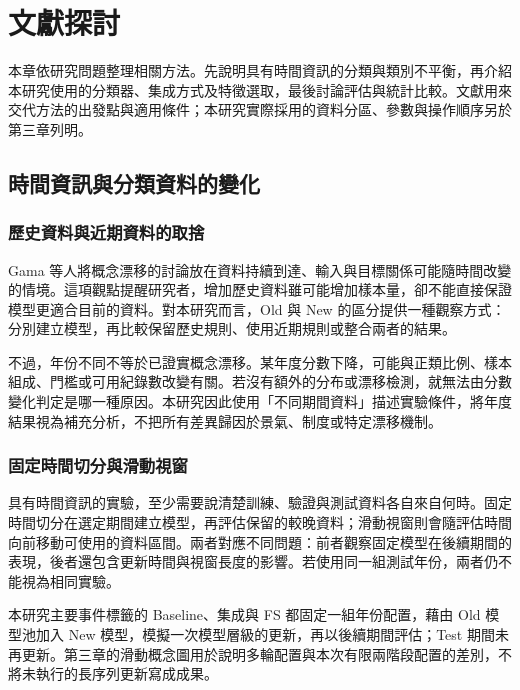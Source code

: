 \chapter{文獻探討}\label{chap:literature}
\begingroup
\setlength{\emergencystretch}{2em}

本章依研究問題整理相關方法。先說明具有時間資訊的分類與類別不平衡，再介紹本研究使用的分類器、集成方式及特徵選取，最後討論評估與統計比較。文獻用來交代方法的出發點與適用條件；本研究實際採用的資料分區、參數與操作順序另於第三章列明。

\section{時間資訊與分類資料的變化}

\subsection{歷史資料與近期資料的取捨}

Gama 等人\autocite{gama2014drift}將概念漂移的討論放在資料持續到達、輸入與目標關係可能隨時間改變的情境。這項觀點提醒研究者，增加歷史資料雖可能增加樣本量，卻不能直接保證模型更適合目前的資料。對本研究而言，Old 與 New 的區分提供一種觀察方式：分別建立模型，再比較保留歷史規則、使用近期規則或整合兩者的結果。

不過，年份不同不等於已證實概念漂移。某年度分數下降，可能與正類比例、樣本組成、門檻或可用紀錄數改變有關。若沒有額外的分布或漂移檢測，就無法由分數變化判定是哪一種原因。本研究因此使用「不同期間資料」描述實驗條件，將年度結果視為補充分析，不把所有差異歸因於景氣、制度或特定漂移機制。

\subsection{固定時間切分與滑動視窗}

具有時間資訊的實驗，至少需要說清楚訓練、驗證與測試資料各自來自何時。固定時間切分在選定期間建立模型，再評估保留的較晚資料；滑動視窗則會隨評估時間向前移動可使用的資料區間。兩者對應不同問題：前者觀察固定模型在後續期間的表現，後者還包含更新時間與視窗長度的影響。若使用同一組測試年份，兩者仍不能視為相同實驗。

本研究主要事件標籤的 Baseline、集成與 FS 都固定一組年份配置，藉由 Old 模型池加入 New 模型，模擬一次模型層級的更新，再以後續期間評估；Test 期間未再更新。第三章的滑動概念圖用於說明多輪配置與本次有限兩階段配置的差別，不將未執行的長序列更新寫成成果。

